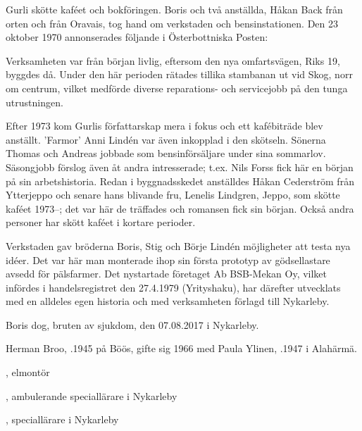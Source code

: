 Gurli skötte kaféet och bokföringen. Boris och två anställda, Håkan Back från orten och  från Oravais, tog hand om verkstaden och bensinstationen. Den 23 oktober 1970 annonserades följande i Österbottniska Posten:




Verksamheten var från början livlig, eftersom den nya omfartsvägen, Riks 19, byggdes då. Under den här perioden rätades tillika stambanan ut vid Skog, norr om centrum, vilket medförde diverse reparations- och servicejobb på den tunga utrustningen.

Efter 1973 kom Gurlis författarskap mera i fokus och ett kafébiträde blev anställt. 'Farmor' Anni Lindén var även inkopplad i den skötseln. Sönerna Thomas och Andreas jobbade som bensinförsäljare under sina sommarlov. Säsongjobb förslog även åt andra intresserade; t.ex. Nils Forss fick här en början på sin arbetshistoria. Redan i byggnadsskedet anställdes Håkan Cederström från Ytterjeppo och senare hans blivande fru, Lenelis Lindgren, Jeppo, som skötte kaféet 1973--; det var här de träffades och romansen fick sin början.	Också andra personer har skött kaféet i kortare perioder.

Verkstaden gav bröderna Boris, Stig och Börje Lindén möjligheter att testa nya idéer. Det var här man monterade ihop sin första prototyp	av gödsellastare avsedd för pälsfarmer. Det nystartade företaget Ab	BSB-Mekan Oy, vilket infördes i handelsregistret den 27.4.1979 (Yrityshaku), har därefter utvecklats med en alldeles egen historia och med verksamheten förlagd till Nykarleby.

Boris dog, bruten av sjukdom, den 07.08.2017 i Nykarleby.



%



%
Herman Broo, .1945 på Böös, gifte sig 1966 med Paula Ylinen, .1947 i Alahärmä.
\begin{jhchildren}
  \item {}, elmontör
  \item {}, ambulerande speciallärare i Nykarleby
  \item {}, speciallärare i Nykarleby
\end{jhchildren}

